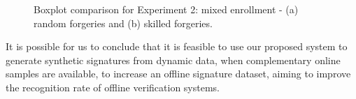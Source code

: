 \begin{figure}[!htb]
\centering
\hspace*{0.8in} %
\caption{Boxplot comparison for Experiment 2: mixed enrollment - (a) random forgeries and (b) skilled forgeries. } \label{fig:boxexp2}
\end{figure}

It is possible for us to conclude that it is feasible to use our proposed system to generate synthetic signatures from dynamic data, when complementary online samples are available, to increase an offline signature dataset, aiming to improve the recognition rate of offline verification systems.




